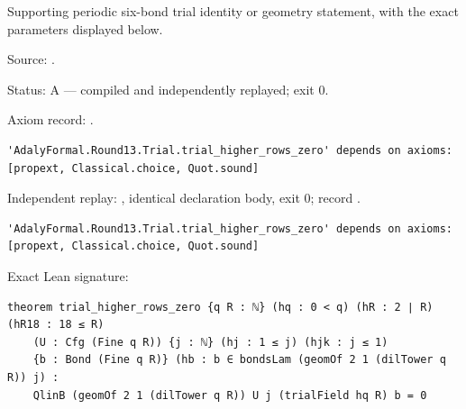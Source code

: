 \begin{theorem}[bp-371]
\label{bp-371}
\leanok
Supporting periodic six-bond trial identity or geometry statement, with the exact parameters displayed below.

\par Source: \texttt{}.
\par Status: A — compiled and independently replayed; exit 0.
\par Axiom record: \texttt{}.
\begin{verbatim}
'AdalyFormal.Round13.Trial.trial_higher_rows_zero' depends on axioms: [propext, Classical.choice, Quot.sound]
\end{verbatim}
\par Independent replay: \texttt{}, identical declaration body, exit 0; record \texttt{}.
\begin{verbatim}
'AdalyFormal.Round13.Trial.trial_higher_rows_zero' depends on axioms: [propext, Classical.choice, Quot.sound]
\end{verbatim}
\par Exact Lean signature:
\begin{verbatim}
theorem trial_higher_rows_zero {q R : ℕ} (hq : 0 < q) (hR : 2 ∣ R) (hR18 : 18 ≤ R)
    (U : Cfg (Fine q R)) {j : ℕ} (hj : 1 ≤ j) (hjk : j ≤ 1)
    {b : Bond (Fine q R)} (hb : b ∈ bondsLam (geomOf 2 1 (dilTower q R)) j) :
    QlinB (geomOf 2 1 (dilTower q R)) U j (trialField hq R) b = 0
\end{verbatim}
\end{theorem}

